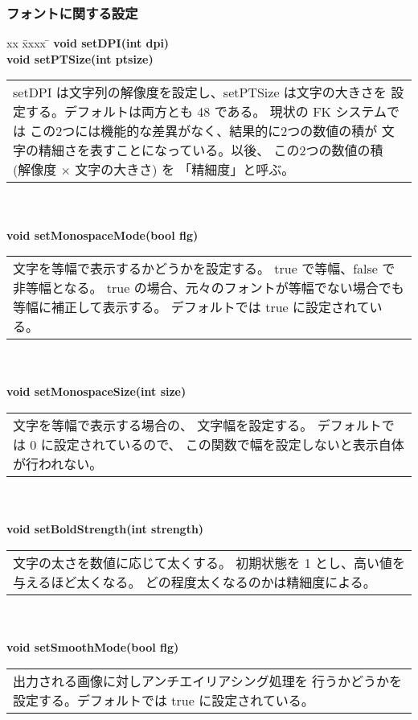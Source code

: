 \subsubsection{フォントに関する設定}
\begin{tabbing}
xx \= xxxx \= \kill
\> \textbf{void setDPI(int dpi)} \\
\> \textbf{void setPTSize(int ptsize)} \\
	\> \> \begin{tabular}{p{15cm}}
		setDPI は文字列の解像度を設定し、setPTSize は文字の大きさを
		設定する。デフォルトは両方とも 48 である。
		現状の FK システムでは
		この2つには機能的な差異がなく、結果的に2つの数値の積が
		文字の精細さを表すことになっている。以後、
		この2つの数値の積 (解像度 \(\times\) 文字の大きさ) を
		「精細度」と呼ぶ。
	\end{tabular} \\ \\

\> \textbf{void setMonospaceMode(bool flg)} \\
	\> \> \begin{tabular}{p{15cm}}
		文字を等幅で表示するかどうかを設定する。
		true で等幅、false で非等幅となる。
		true の場合、元々のフォントが等幅でない場合でも
		等幅に補正して表示する。
		デフォルトでは true に設定されている。
	\end{tabular} \\ \\

\> \textbf{void setMonospaceSize(int size)} \\
	\> \> \begin{tabular}{p{15cm}}
		文字を等幅で表示する場合の、
		文字幅を設定する。
		デフォルトでは 0 に設定されているので、
		この関数で幅を設定しないと表示自体が行われない。
	\end{tabular} \\ \\

\> \textbf{void setBoldStrength(int strength)} \\
	\> \> \begin{tabular}{p{15cm}}
		文字の太さを数値に応じて太くする。
		初期状態を 1 とし、高い値を与えるほど太くなる。
		どの程度太くなるのかは精細度による。
	\end{tabular} \\ \\

\> \textbf{void setSmoothMode(bool flg)} \\
	\> \> \begin{tabular}{p{15cm}}
		出力される画像に対しアンチエイリアシング処理を
		行うかどうかを設定する。デフォルトでは true に設定されている。
	\end{tabular} \\ \\


\end{tabbing}
